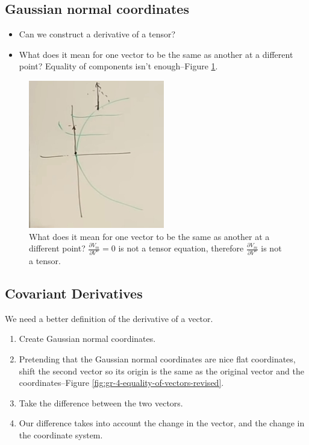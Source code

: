\documentclass[]{article}
\begin{document}
\subsection{Gaussian normal coordinates}

\begin{itemize}
	\item Can we construct a derivative of a tensor?
	\item What does it mean for one vector to be the same as another at a different point? Equality of components isn't enough--Figure \ref{fig:gr-4-equality-of-vectors}. 
\end{itemize}

\begin{figure}[H]
	\begin{center}
		\caption[Comparing vectors at different points]{What does it mean for one vector to be the same as another at a different point? $\frac{\partial V_m}{\partial V^n}=0$ is not a tensor equation, therefore $\frac{\partial V_m}{\partial V^n}$ is not a tensor.}\label{fig:gr-4-equality-of-vectors}
		\includegraphics{gr-4-equality-of-vectors}
	\end{center}
\end{figure}

\subsection{Covariant Derivatives}

We need a better definition of the derivative of a vector.

\begin{enumerate}
	\item Create Gaussian normal coordinates.
	\item Pretending that the Gaussian normal coordinates are nice flat coordinates, shift the second vector so its origin is the same as the original vector and the coordinates--Figure \ref{fig:gr-4-equality-of-vectors-revised}.
	\item Take the difference between the two vectors.
	\item Our difference takes into account the change in the vector, and the change in the coordinate system.
\end{enumerate}
\end{document}

